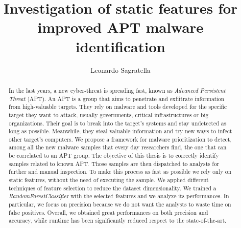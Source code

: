 \documentclass[binding=0.6cm,LaM,oneside]{sapthesis} %
\title{Investigation of static features for improved APT malware identification}
\author{Leonardo Sagratella}
\begin{document}
	\frontmatter
	\maketitle
	\dedication{
		Dedicato alla mia famiglia, mio padre, mia madre e mia sorella che mi sono sempre stati vicini e mi hanno sempre sostenuto in questo percorso. Ai miei compagni di corso conosciuti in questi anni, in particolare Davide, Gianluca e Gianmarco grazie davvero. Dedicato ai miei più grandi amici di sempre del campeggio Antonio, Cecilia, Federico e Lucia, ma in particolare a quel pazzo furioso di Federico, grazie per tutte le risate che mi fai fare. Dedicato ai miei amici storici del liceo, che dopo tutti questi anni continuiamo a frequentarci.
		Ma il rigraziamento più grande va alla mia ragazza e compagna di corso Federica, che mi ha sempre supportato e sopportato in questi anni. Senza di lei probabilmente starei ancora al primo anno di università, grazie di cuore ti amo.
}
 	\begin{abstract}
		In the last years, a new cyber-threat is spreading fast, known as \textit{Advanced Persistent Threat} (APT). An APT is a group that aims to penetrate and exflitrate information from high-valuable targets. They rely on malware and tools developed for the specific target they want to attack, usually governments, critical infrastructures or big organizations. Their goal is to break into the target's systems and stay undetected as long as possible. Meanwhile, they steal valuable information and try new ways to infect other target's computers. We propose a framework for malware prioritization to detect, among all the new malware samples that every day researchers find, the one that can be correlated to an APT group. The objective of this thesis is to correctly identify samples related to known APT. Those samples are then dispatched to analysts for further and manual inspection. To make this process as fast as possible we rely only on static features, without the need of executing the sample. We applied different techniques of feature selection to reduce the dataset dimensionality. We trained a \textit{RandomForestClassifier} with the selected features and we analyze its performances. In particular, we focus on precision because we do not want the analysts to waste time on false positives. Overall, we obtained great performances on both precision and accuracy, while runtime has been significantly reduced respect to the state-of-the-art.
	\end{abstract}
	\tableofcontents
	\mainmatter
	
	
	
	
	
	
	
	
	\backmatter
	\cleardoublepage
	
	

	
	
\end{document}
